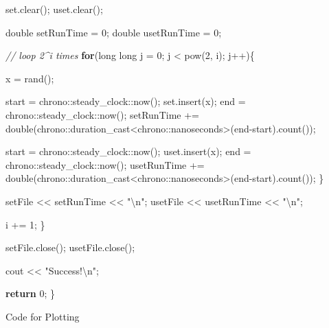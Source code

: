 \documentclass[11pt]{article}
\newenvironment{Shaded}{}{}
\newcommand{\DataTypeTok}[1]{\textcolor[rgb]{0.56,0.13,0.00}{{#1}}}
\newcommand{\DecValTok}[1]{\textcolor[rgb]{0.25,0.63,0.44}{{#1}}}
\newcommand{\StringTok}[1]{\textcolor[rgb]{0.25,0.44,0.63}{{#1}}}
\newcommand{\CommentTok}[1]{\textcolor[rgb]{0.38,0.63,0.69}{\textit{{#1}}}}
\newcommand{\NormalTok}[1]{{#1}}
\newcommand{\SpecialCharTok}[1]{\textcolor[rgb]{0.25,0.44,0.63}{{#1}}}
\newcommand{\ControlFlowTok}[1]{\textcolor[rgb]{0.00,0.44,0.13}{\textbf{{#1}}}}
\begin{document}
\begin{Shaded}
\begin{Highlighting}[]
\NormalTok{        set.clear();}
\NormalTok{        uset.clear();}
        
        \DataTypeTok{double}\NormalTok{ setRunTime = }\DecValTok{0}\NormalTok{;}
        \DataTypeTok{double}\NormalTok{ usetRunTime = }\DecValTok{0}\NormalTok{;}
        
        \CommentTok{// loop 2^i times}
        \ControlFlowTok{for}\NormalTok{(}\DataTypeTok{long} \DataTypeTok{long}\NormalTok{ j = }\DecValTok{0}\NormalTok{; j < pow(}\DecValTok{2}\NormalTok{, i); j++)\{}
            
\NormalTok{            x = rand();}
            
\NormalTok{            start = chrono::steady_clock::now();}
\NormalTok{            set.insert(x);}
\NormalTok{            end = chrono::steady_clock::now();}
\NormalTok{            setRunTime += }\DataTypeTok{double}\NormalTok{(chrono::duration_cast<chrono::nanoseconds>(end-start).count());}
            
\NormalTok{            start = chrono::steady_clock::now();}
\NormalTok{            uset.insert(x);}
\NormalTok{            end = chrono::steady_clock::now();}
\NormalTok{            usetRunTime += }\DataTypeTok{double}\NormalTok{(chrono::duration_cast<chrono::nanoseconds>(end-start).count());}
\NormalTok{        \}}
        
\NormalTok{        setFile << setRunTime << }\StringTok{"}\SpecialCharTok{\textbackslash{}n}\StringTok{"}\NormalTok{;}
\NormalTok{        usetFile << usetRunTime << }\StringTok{"}\SpecialCharTok{\textbackslash{}n}\StringTok{"}\NormalTok{;}
        
\NormalTok{        i += }\DecValTok{1}\NormalTok{;}
\NormalTok{    \}}
    
    
\NormalTok{    setFile.close();}
\NormalTok{    usetFile.close();}
    
\NormalTok{    cout << }\StringTok{"Success!}\SpecialCharTok{\textbackslash{}n}\StringTok{"}\NormalTok{;}
    
    \ControlFlowTok{return} \DecValTok{0}\NormalTok{;}
\NormalTok{\}}
\end{Highlighting}
\end{Shaded}

    Code for Plotting
\end{document}
